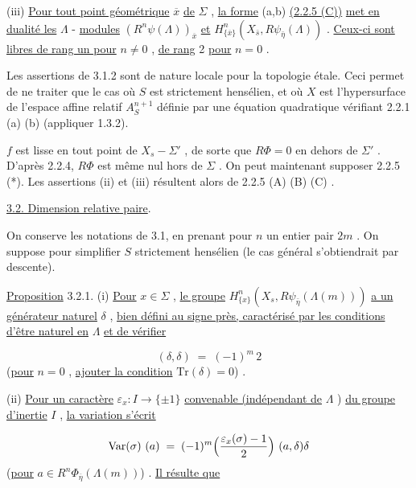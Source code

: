 (iii)  \underline{Pour tout point géométrique} $\overline{x}$ \underline{de} $\Sigma$ , \underline{la forme} (a,b) \underline{(2.2.5 (C))} \underline{met en dualité les} $\Lambda$ - \underline{modules} $(R^{n}\psi(\Lambda))_{\overline{x}}$ \underline{et} $H^{n}_{\{\overline{x}\}}(X_{\bar s},R\psi_{\bar\eta}(\Lambda))$ . \underline{Ceux-ci sont libres de rang un pour} $n \neq 0$ , \underline{de rang} 2 \underline{pour} $n = 0$ .

Les assertions de 3.1.2 sont de nature locale pour la topologie étale. Ceci permet de ne traiter que le cas où $S$ est strictement hensélien, et où $X$ est l'hypersurface de l'espace affine relatif $A^{n+1}_{S}$ définie par une équation quadratique vérifiant 2.2.1 (a) (b) (appliquer 1.3.2).

$f$ est lisse en tout point de $X_{s} - \Sigma'$ , de sorte que $R\Phi = 0$ en dehors de $\Sigma'$ . D'après 2.2.4, $R\Phi$ est même nul hors de $\Sigma$ . On peut maintenant supposer 2.2.5 (*). Les assertions (ii) et (iii) résultent alors de 2.2.5 (A) (B) (C) .


\underline{3.2. Dimension relative paire}.

On conserve les notations de 3.1, en prenant pour $n$ un entier pair $2m$ . On suppose pour simplifier $S$ strictement hensélien (le cas général s'obtiendrait par descente).

\underline{Proposition} 3.2.1.  (i) \underline{Pour} $x \in \Sigma$ , \underline{le groupe} $H^{n}_{\{x\}}(X_s,R\psi_{\bar\eta}(\Lambda(m)))$ \underline{a un générateur naturel} $\delta$ , \underline{bien défini au signe près, caractérisé par les conditions d'être naturel en} $\Lambda$ \underline{et de vérifier} 



\begin{equation*}
 (\delta,\delta) \;=\; (-1)^{m}\, 2
\end{equation*}
(\underline{pour} $n = 0$ , \underline{ajouter la condition} $\mathrm{Tr}(\delta) = 0$) .

(ii)  \underline{Pour un caractère} $\varepsilon_{x} : I \longrightarrow \{\pm 1\}$ \underline{convenable (indépendant de} $\Lambda$ ) \underline{du groupe d'inertie} $I$ , \underline{la variation s'écrit}

\begin{equation*}
\mathrm{Var}(\sigma)\ (a) \;=\; (-1)^{m}\Bigl(\frac{\varepsilon_{x}(\sigma)-1}{2}\Bigr)\ (a,\delta)\delta
\end{equation*}
(\underline{pour} $a \in R^{n}\Phi_{\overline{\eta}}(\Lambda(m))$) . \underline{Il résulte que}

